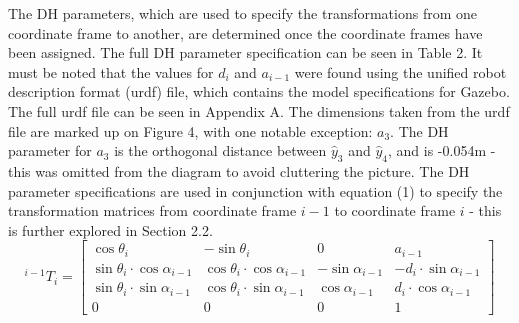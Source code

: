 \documentclass[a4paper]{article}
\begin{document}
The DH parameters, which are used to specify the transformations from one coordinate frame to another, are determined once the coordinate frames have been assigned. The full DH parameter specification can be seen in Table 2. It must be noted that the values for $d_i$ and $a_{i-1}$ were found using the unified robot description format (urdf) file, which contains the model specifications for Gazebo. The full urdf file can be seen in Appendix A. The dimensions taken from the urdf file are marked up on Figure 4, with one notable exception: $a_3$. The DH parameter for $a_3$ is the orthogonal distance between $\hat{y}_3$ and $\hat{y}_4$, and is -0.054$\si{\meter}$ - this was omitted from the diagram to avoid cluttering the picture. The DH parameter specifications are used in conjunction with equation (1) to specify the transformation matrices from coordinate frame $i-1$ to coordinate frame $i$ - this is further explored in Section 2.2.\\

\begin{equation}
	^{i-1} T_i =
	\begin{bmatrix}
	\cos \theta_i 							& -\sin \theta_i  							& 0 					& a_{i-1}\\
	\sin \theta_i \cdot \cos \alpha_{i-1}	& \cos \theta_i \cdot \cos \alpha_{i-1}		& -\sin \alpha_{i-1} 	& -d_i \cdot \sin \alpha_{i-1}\\
	\sin \theta_i \cdot \sin \alpha_{i-1}	& \cos \theta_i \cdot \sin \alpha_{i-1}		& \cos \alpha_{i-1}		& d_i \cdot \cos \alpha_{i-1}\\
	0										& 0											& 0						& 1
	\end{bmatrix}
\end{equation}

\vspace{0.25cm}
\end{document}

